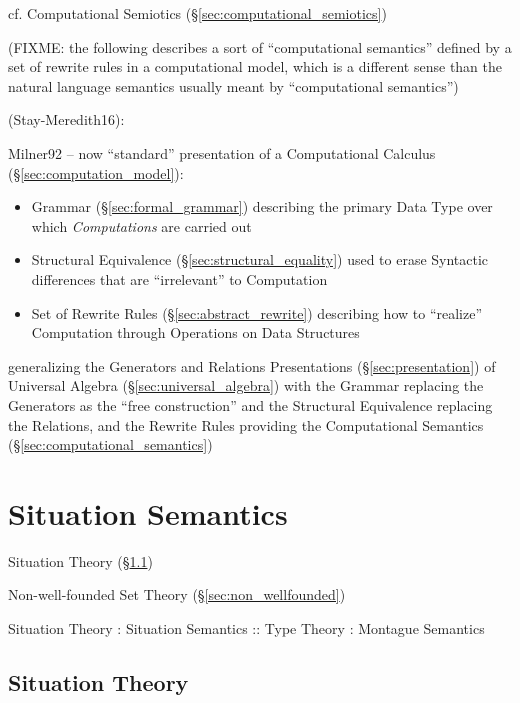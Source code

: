 cf. Computational Semiotics (\S\ref{sec:computational_semiotics})

(FIXME: the following describes a sort of ``computational semantics'' defined by
a set of rewrite rules in a computational model, which is a different sense than
the natural language semantics usually meant by ``computational semantics'')

(Stay-Meredith16):

Milner92 \cite{milner92} -- now ``standard'' presentation of a Computational
Calculus (\S\ref{sec:computation_model}):
\begin{itemize}
  \item Grammar (\S\ref{sec:formal_grammar}) describing the primary Data Type
    over which \emph{Computations} are carried out
  \item Structural Equivalence (\S\ref{sec:structural_equality}) used to erase
    Syntactic differences that are ``irrelevant'' to Computation
  \item Set of Rewrite Rules (\S\ref{sec:abstract_rewrite}) describing how to
    ``realize'' Computation through Operations on Data Structures
\end{itemize}
generalizing the Generators and Relations Presentations
(\S\ref{sec:presentation}) of Universal Algebra (\S\ref{sec:universal_algebra})
with the Grammar replacing the Generators as the ``free construction'' and the
Structural Equivalence replacing the Relations, and the Rewrite Rules providing
the Computational Semantics (\S\ref{sec:computational_semantics})



\section{Situation Semantics}\label{sec:situation_semantics}

Situation Theory (\S\ref{sec:situation_theory})

Non-well-founded Set Theory (\S\ref{sec:non_wellfounded})

Situation Theory : Situation Semantics
  :: Type Theory : Montague Semantics



\subsection{Situation Theory}\label{sec:situation_theory}



